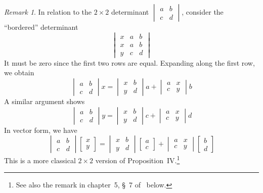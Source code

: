 \documentclass[letterpaper,12pt]{article}
\theoremstyle{definition}
\theoremstyle{remark}
\newtheorem*{rmk}{Remark}
\begin{document}
\begin{rmk}
In relation to the \(2\times 2\) determinant \(\begin{vmatrix}a&b\\c&d\end{vmatrix}\), consider the ``bordered'' determinant
\[\begin{vmatrix}
x&a&b\\
x&a&b\\
y&c&d
\end{vmatrix}\]
It must be zero since the first two rows are equal. Expanding along the first row, we obtain
\[\begin{vmatrix}a&b\\c&d\end{vmatrix}x=\begin{vmatrix}x&b\\y&d\end{vmatrix}a+\begin{vmatrix}a&x\\c&y\end{vmatrix}b\]
A similar argument shows
\[\begin{vmatrix}a&b\\c&d\end{vmatrix}y=\begin{vmatrix}x&b\\y&d\end{vmatrix}c+\begin{vmatrix}a&x\\c&y\end{vmatrix}d\]
In vector form, we have
\[\begin{vmatrix}a&b\\c&d\end{vmatrix}\begin{bmatrix}x\\y\end{bmatrix}=\begin{vmatrix}x&b\\y&d\end{vmatrix}\begin{bmatrix}a\\c\end{bmatrix}+\begin{vmatrix}a&x\\c&y\end{vmatrix}\begin{bmatrix}b\\d\end{bmatrix}\]
This is a more classical \(2\times 2\) version of Proposition~IV.\footnote{See also the remark in chapter~5, \S~7 of~\cite{greub2} below.}
\end{rmk}
\end{document}
